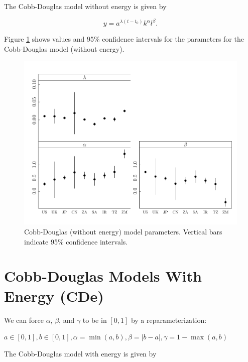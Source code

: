 \documentclass[preprint,authoryear,12pt]{elsarticle}\usepackage{graphicx, color}
\makeatletter
\def\maxwidth{ %
  \ifdim\Gin@nat@width>\linewidth
    \linewidth
  \else
    \Gin@nat@width
  \fi
}
\newenvironment{knitrout}{}{} %
\makeatother
\begin{document}
The Cobb-Douglas model without energy is given by

\begin{equation} \label{eq:CD_No_Energy}
  y = a^{\lambda (t-t_0)}k^{\alpha}l^{\beta}.
\end{equation}

Figure \ref{fig:CD_Params_Graph} shows values and 95\% confidence intervals for the parameters for the Cobb-Douglas model (without energy).

\begin{knitrout}
\color{fgcolor}\begin{figure}[H]

\includegraphics[width=\maxwidth]{figure/CD_Params_Graph} \caption[Cobb-Douglas (without energy) model parameters]{Cobb-Douglas (without energy) model parameters. Vertical bars indicate 95\% confidence intervals.\label{fig:CD_Params_Graph}}
\end{figure}


\end{knitrout}


\section{Cobb-Douglas Models With Energy (CDe)}

We can force $\alpha$, $\beta$, and $\gamma$ to be in $[0,1]$ by a reparameterization:

$a \in[0,1], b \in [0,1], \alpha=\min(a,b), \beta=|b-a|, \gamma = 1-\max(a,b)$

The Cobb-Douglas model with energy is given by
\end{document}
